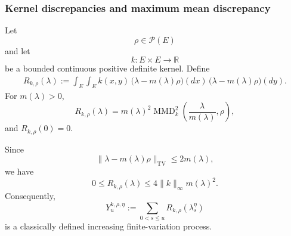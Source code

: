 \documentclass[a4paper,10pt]{article}
\begin{document}
\subsubsection{Kernel discrepancies and maximum mean discrepancy}

Let
\[
        \rho\in\mathcal P(E)
\]
and let
\[
        k:E\times E\longrightarrow\mathbb R
\]
be a bounded continuous positive definite kernel. Define
\[
\begin{aligned}
R_{k,\rho}(\lambda)
:=
\int_E\int_E
k(x,y)\,
\bigl(\lambda-m(\lambda)\rho\bigr)(dx)\,
\bigl(\lambda-m(\lambda)\rho\bigr)(dy).
\end{aligned}
\]
For \(m(\lambda)>0\),
\[
        R_{k,\rho}(\lambda)
        =
        m(\lambda)^2
        \operatorname{MMD}_k^2
        \left(
        \frac{\lambda}{m(\lambda)},
        \rho
        \right),
\]
and \(R_{k,\rho}(0)=0\).

Since
\[
\bigl\lVert
\lambda-m(\lambda)\rho
\bigr\rVert_{\mathrm{TV}}
\le
2m(\lambda),
\]
we have
\[
        0
        \le
        R_{k,\rho}(\lambda)
        \le
        4\lVert k\rVert_\infty m(\lambda)^2.
\]
Consequently,
\[
        Y_u^{k,\rho,\eta}
        :=
        \sum_{0<s\le u}
        R_{k,\rho}(\lambda_s^\eta)
\]
is a classically defined increasing finite-variation process.
\end{document}
